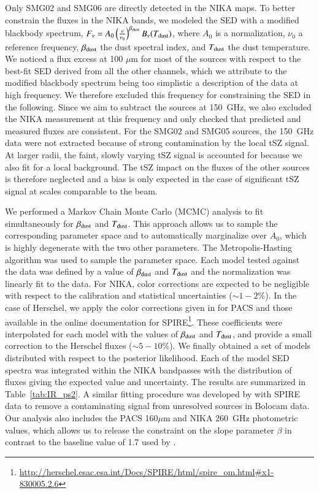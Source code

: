 \documentclass[traditabstract]{aa}
\begin{document}
Only SMG02 and SMG06 are directly detected in the NIKA maps. To better constrain the fluxes in the NIKA bands, we modeled the SED with a modified blackbody spectrum, $F_{\nu} = A_0 \left(\frac{\nu}{\nu_0}\right)^{\beta_{\rm dust}} B_{\nu}(T_{\rm dust})$, where $A_0$ is a normalization, $\nu_0$ a reference frequency, $\beta_{\rm dust}$ the dust spectral index, and $T_{\rm dust}$ the dust temperature. We noticed a flux excess at 100 $\mu$m for most of the sources with respect to the best-fit SED derived from all the other channels, which we attribute to the modified blackbody spectrum being too simplistic a description of the data at high frequency. We therefore excluded this frequency for constraining the SED in the following. Since we aim to subtract the sources at 150~GHz, we also excluded the NIKA measurement at this frequency and only checked that predicted and measured fluxes are consistent. For the SMG02 and SMG05 sources, the 150~GHz data were not extracted because of strong contamination by the local tSZ signal. At larger radii, the faint, slowly varying tSZ signal is accounted for because we also fit for a local background. The tSZ impact on the fluxes of the other sources is therefore neglected and a bias is only expected in the case of significant tSZ signal at scales comparable to the beam.

We performed a Markov Chain Monte Carlo (MCMC) analysis to fit simultaneously for $\beta_{\rm dust}$ and $T_{\rm dust}$. This approach allows us to sample the corresponding parameter space and to automatically marginalize over $A_0$, which is highly degenerate with the two other parameters. The Metropolis-Hasting algorithm was used to sample the parameter space. Each model tested against the data was defined by a value of $\beta_{\rm dust}$ and $T_{\rm dust}$ and the normalization was linearly fit to the data. For NIKA, color corrections are expected to be negligible with respect to the calibration and statistical uncertainties ($\sim 1-2$\%). In the case of Herschel, we apply the color corrections given in \cite{poglitsch2010} for PACS and those available in the online documentation for SPIRE\footnote{\url{http://herschel.esac.esa.int/Docs/SPIRE/html/spire_om.html\#x1-830005.2.6}}. These coefficients were interpolated for each model with the values of $\beta_{\rm dust}$ and $T_{\rm dust}$, and provide a small correction to the Herschel fluxes ($\sim 5-10$\%). We finally obtained a set of models distributed with respect to the posterior likelihood. Each of the model SED spectra was integrated within the NIKA bandpasses with the distribution of fluxes giving the expected value and uncertainty. The results are summarized in Table~\ref{tab:IR_ps2}. A similar fitting procedure was developed by \cite{sayers2013c} with SPIRE data  to remove a contaminating signal from unresolved sources in Bolocam data. Our analysis also includes the PACS 160$\mu$m and  NIKA 260~GHz photometric values, which allows us to release the constraint on the slope parameter $\beta$ in contrast to the baseline value of 1.7 used by \cite{sayers2013c}.
\end{document}
